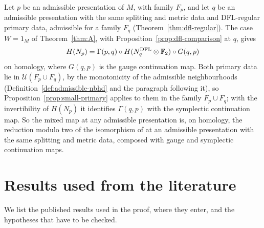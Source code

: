 \documentclass[11pt]{amsart}
\theoremstyle{definition}
\theoremstyle{remark}
\theoremstyle{plain}
\numberwithin{equation}{section}
\newcommand{\FF}{\mathbb{F}_2}
\begin{document}
Let $p$ be an admissible presentation of $M$, with family $F_p$, and let $q$ be an
admissible presentation with the same splitting and metric data and DFL-regular primary data,
admissible for a family $F_q$ (Theorem~\ref{thm:dfl-regular}). The case $W=1_M$ of
Theorem~\ref{thm:A}, with Proposition~\ref{prop:dfl-comparison} at $q$, gives
\[
H(N_p)=\Gamma(p,q)\circ H(N^{\rm DFL}_q\otimes\FF)\circ G(q,p)
\]
on homology, where $G(q,p)$ is the gauge continuation map. Both primary data lie in
$\mathcal U(F_p\cup F_q)$, by the monotonicity of the admissible neighbourhoods
(Definition~\ref{def:admissible-nbhd} and the paragraph following it), so
Proposition~\ref{prop:small-primary} applies to them in
the family $F_p\cup F_q$; with the invertibility of $H(N_p)$ it identifies $\Gamma(q,p)$ with the
symplectic continuation map. So the mixed map at
any admissible presentation is, on homology, the reduction modulo two of the isomorphism of
\cite{DFL} at an admissible presentation with the same splitting and metric data, composed with
gauge and symplectic continuation maps.

\appendix
\section{Results used from the literature}\label{app:inputs}

We list the published results used in the proof, where they enter, and
the hypotheses that have to be checked.
\end{document}
